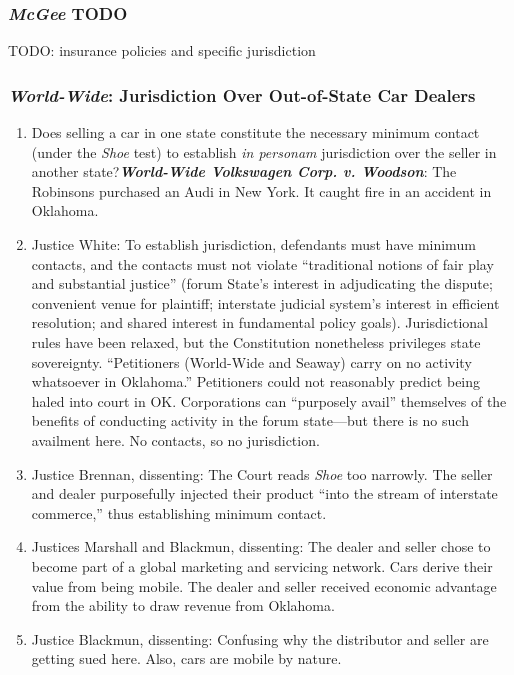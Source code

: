 \subsubsection{\emph{McGee} TODO}

TODO: insurance policies and specific jurisdiction

\subsubsection{\emph{World-Wide}: Jurisdiction Over Out-of-State Car Dealers}

\begin{enumerate}
    \item Does selling a car in one state constitute the necessary minimum 
    contact (under the \emph{Shoe} test) to establish \emph{in personam} 
    jurisdiction over the seller in another state?\textbf{\emph{World-Wide 
    Volkswagen Corp. v. Woodson}}: The Robinsons purchased an Audi in New 
    York. It caught fire in an accident in Oklahoma.   \item Justice White: 
    To establish jurisdiction, defendants must have minimum contacts, and the 
    contacts must not violate ``traditional notions of fair play and 
    substantial justice'' (forum State's interest in adjudicating the dispute; 
    convenient venue for plaintiff; interstate judicial system's interest in 
    efficient resolution; and shared interest in fundamental policy goals). 
    Jurisdictional rules have been relaxed, but the Constitution nonetheless 
    privileges state sovereignty. ``Petitioners (World-Wide and Seaway) carry 
    on no activity whatsoever in Oklahoma.'' Petitioners could not reasonably 
    predict being haled into court in OK. Corporations can ``purposely avail'' 
    themselves of the benefits of conducting activity in the forum state---but 
    there is no such availment here. No contacts, so no jurisdiction.
    \item Justice Brennan, dissenting: The Court reads \emph{Shoe} too 
    narrowly. The seller and dealer purposefully injected their product 
    ``into the stream of interstate commerce,'' thus establishing minimum 
    contact.
    \item Justices Marshall and Blackmun, dissenting: The dealer and seller 
    chose to become part of a global marketing and servicing network. Cars 
    derive their value from being mobile. The dealer and seller received 
    economic advantage from the ability to draw revenue from Oklahoma.
    \item Justice Blackmun, dissenting: Confusing why the distributor and 
    seller are getting sued here. Also, cars are mobile by nature.

\end{enumerate}

